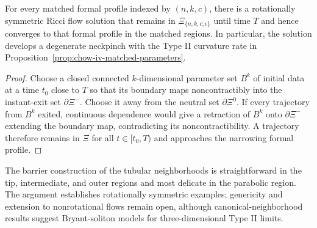 \begin{theorem}
\label{thm:chow-iv-wazewski-degenerate-neckpinch}
For every matched formal profile indexed by $(n,k,c)$, there is a rotationally
symmetric Ricci flow solution that remains in
$\Xi_{\{n,k,c;\epsilon\}}$ until time $T$ and hence converges to that formal
profile in the matched regions.  In particular, the solution develops a
degenerate neckpinch with the Type II curvature rate in
Proposition~\ref{prop:chow-iv-matched-parameters}.
\end{theorem}
\begin{proof}
Choose a closed connected $k$-dimensional parameter set $B^k$ of initial data
at a time $t_0$ close to $T$ so that its boundary maps noncontractibly into
the instant-exit set $\partial\Xi^-$.  Choose it away from the neutral set
$\partial\Xi^0$.  If every trajectory from $B^k$ exited, continuous dependence
would give a retraction of $B^k$ onto $\partial\Xi^-$ extending the boundary
map, contradicting its noncontractibility.  A trajectory therefore remains in
$\Xi$ for all $t\in[t_0,T)$ and approaches the narrowing formal profile.
\end{proof}

\begin{remark}
\label{rem:chow-iv-degenerate-neckpinch-scope}
The barrier construction of the tubular neighborhoods is straightforward in
the tip, intermediate, and outer regions and most delicate in the parabolic
region.  The argument establishes rotationally symmetric examples; genericity
and extension to nonrotational flows remain open, although canonical-neighborhood
results suggest Bryant-soliton models for three-dimensional Type II limits.
\end{remark}
